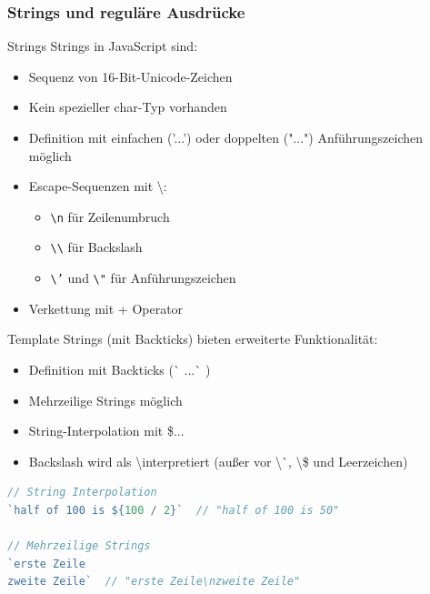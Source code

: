 \subsubsection{Strings und reguläre Ausdrücke}

\begin{definition}{Strings}
    Strings in JavaScript sind:
    \begin{itemize}
        \item Sequenz von 16-Bit-Unicode-Zeichen
        \item Kein spezieller char-Typ vorhanden
        \item Definition mit einfachen ('...') oder doppelten ("...") Anführungszeichen möglich
        \item Escape-Sequenzen mit \textbackslash:
        \begin{itemize}
            \item \texttt{\textbackslash n} für Zeilenumbruch
            \item \texttt{\textbackslash\textbackslash} für Backslash
            \item \texttt{\textbackslash'} und \texttt{\textbackslash"} für Anführungszeichen
        \end{itemize}
        \item Verkettung mit + Operator
    \end{itemize}
\end{definition}

\begin{concept}{Template Strings}
    (mit Backticks) bieten erweiterte Funktionalität:
    \begin{itemize}
		\item Definition mit Backticks (\`{} ...\`{} )
        \item Mehrzeilige Strings möglich
        \item String-Interpolation mit \${...}
		\item Backslash wird als \textbackslash interpretiert (außer vor \textbackslash \`{}, \textbackslash \$ und Leerzeichen)
    \end{itemize}

\begin{lstlisting}[language=JavaScript, style=basesmol]
// String Interpolation
`half of 100 is ${100 / 2}`  // "half of 100 is 50"

// Mehrzeilige Strings
`erste Zeile
zweite Zeile`  // "erste Zeile\nzweite Zeile"
\end{lstlisting}
\end{concept}

